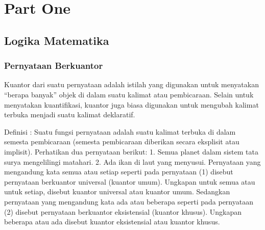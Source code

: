 \documentclass[11pt,fleqn]{book} %
\begin{document}


\pagestyle{empty} %

\tableofcontents %

\cleardoublepage %

\pagestyle{fancy} %


\part{Part One}



\chapter{Logika Matematika}

\section{Pernyataan Berkuantor}

Kuantor dari suatu pernyataan adalah istilah yang digunakan untuk menyatakan “berapa banyak” objek di dalam suatu kalimat atau pembicaraan. Selain untuk menyatakan kuantifikasi, kuantor juga biasa digunakan untuk mengubah kalimat terbuka menjadi suatu kalimat deklaratif.

Definisi : Suatu fungsi pernyataan adalah suatu kalimat terbuka di dalam semesta pembicaraan (semesta pembicaraan diberikan secara eksplisit atau implisit).
Perhatikan dua pernyataan berikut:
1.    Semua planet dalam sistem tata surya mengelilingi matahari.
2.    Ada ikan di laut yang menyusui.
Pernyataan yang mengandung kata semua atau setiap seperti pada pernyataan (1) disebut pernyataan berkuantor universal (kuantor umum). Ungkapan untuk semua atau untuk setiap, disebut kuantor universal atau kuantor umum. Sedangkan pernyataan yang mengandung kata ada atau beberapa seperti pada pernyataan (2) disebut pernyataan berkuantor eksistensial (kuantor khusus). Ungkapan beberapa atau ada disebut kuantor eksistensial atau kuantor khusus.
\end{document}
